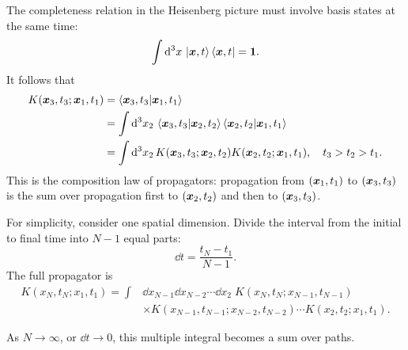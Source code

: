 The completeness relation in the Heisenberg picture must involve basis states at the same time:
\begin{equation}
\int\mathrm{d}^3x\,\left|\bm{x},t\right\rangle\left\langle\bm{x},t\right|=\mathbf1.
\end{equation}
It follows that
\begin{equation}
\begin{split}
K(\bm{x}_3,t_3;\bm{x}_1,t_1)
&=\left\langle\bm{x}_3,t_3\middle|\bm{x}_1,t_1\right\rangle\\
&=\int\mathrm{d}^3x_2\,\left\langle\bm{x}_3,t_3\middle|\bm{x}_2,t_2\right\rangle
\left\langle\bm{x}_2,t_2\middle|\bm{x}_1,t_1\right\rangle\\
&=\int\mathrm{d}^3x_2\,K(\bm{x}_3,t_3;\bm{x}_2,t_2)
K(\bm{x}_2,t_2;\bm{x}_1,t_1),\quad t_3>t_2>t_1.
\end{split}
\end{equation}
This is the composition law of propagators: propagation from $(\bm{x}_1,t_1)$ to $(\bm{x}_3,t_3)$ is the sum over propagation first to $(\bm{x}_2,t_2)$ and then to $(\bm{x}_3,t_3)$.

For simplicity, consider one spatial dimension. Divide the interval from the initial to final time into $N-1$ equal parts:
\begin{equation}
\dd t=\frac{t_N-t_1}{N-1}.
\end{equation}
The full propagator is
\begin{equation}
\begin{split}
K(x_N,t_N;x_1,t_1)=\int&\dd x_{N-1}\dd x_{N-2}\cdots\dd x_2\;
K(x_N,t_N;x_{N-1},t_{N-1})\\
&\times K(x_{N-1},t_{N-1};x_{N-2},t_{N-2})\cdots
K(x_2,t_2;x_1,t_1).
\end{split}
\end{equation}
\begin{center}\end{center}
As $N\to\infty$, or $\dd t\to0$, this multiple integral becomes a sum over paths.
\begin{center}\end{center}

